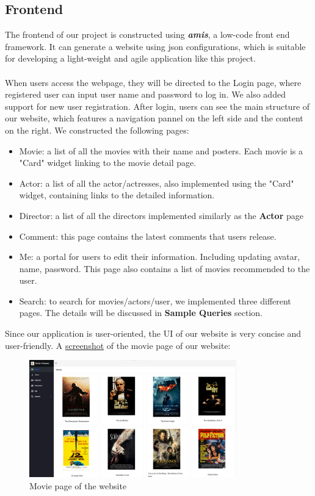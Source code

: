 \begin{CJK*}{UTF8}{gbsn}
\subsection{Frontend}
The frontend of our project is constructed using \textbf{\textit{amis}}, a low-code front end framework. It can generate a website using json configurations, which is suitable for developing a light-weight and agile application like this project.\\\\
When users access the webpage, they will be directed to the Login page, where registered user can input user name and password to log in. We also added support for new user registration.
After login, users can see the  main structure of our website, which features a navigation pannel on the left side and the content on the right. We constructed the following pages:
\begin{itemize}
    \item Movie: a list of all the movies with their name and posters. Each movie is a "Card" widget linking to the movie detail page.
    \item Actor: a list of all the actor/actresses, also implemented using the "Card" widget, containing links to the detailed information.
    \item Director: a list of all the directors implemented similarly as the \textbf{Actor} page
    \item Comment: this page contains the latest comments that users release.
    \item Me: a portal for users to edit their information. Including updating avatar, name, password. This page also contains a list of movies recommended to the user.
    \item Search: to search for movies/actors/user, we implemented three different pages. The details will be discussed in \textbf{Sample Queries} section.
\end{itemize}
\par Since our application is user-oriented, the UI of our website is very concise and user-friendly. A \hyperref[moviePage]{screenshot} of the movie page of our website:\par

\begin{figure}[htbp]
    \centering
    \label{moviePage}
    \includegraphics[width=0.8\textwidth]{website.png}
    \caption{Movie page of the website}
\end{figure}


\end{CJK*}
